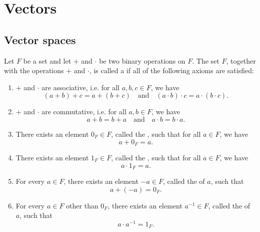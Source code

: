 \chapter{Vectors}\label{chap:vectors}

\section{Vector spaces}

\begin{defn}
Let $ F $ be a set and let $ + $ and $ \cdot $ be two binary operations on $ F $. The set $ F $, together with the operations $ + $ and $ \cdot $, is called a  if all of the following axioms are satisfied:
\begin{enumerate}
    \item $ + $ and $ \cdot $ are associative, i.e. for all $ a,b,c\in F $, we have
    \begin{equation*}
        (a+b)+c=a+(b+c) \quad\text{and}\quad (a\cdot b)\cdot c=a\cdot(b\cdot c).
    \end{equation*}

    \item $ + $ and $ \cdot $ are commutative, i.e. for all $ a,b\in F $, we have
    \begin{equation*}
        a+b=b+a \quad\text{and}\quad a\cdot b=b\cdot a.
    \end{equation*}

    \item There exists an element $ 0_F\in F $, called the , such that for all $ a\in F $, we have
    \begin{equation*}
        a+0_F=a.
    \end{equation*}

    \item There exists an element $ 1_F\in F $, called the , such that for all $ a\in F $, we have
    \begin{equation*}
        a\cdot 1_F=a.
    \end{equation*}

    \item For every $ a\in F $, there exists an element $ -a\in F $, called the  of $ a $, such that
    \begin{equation*}
        a+(-a)=0_F.
    \end{equation*}

    \item For every $ a\in F $ other than $ 0_F $, there exists an element $ a^{-1}\in F $, called the  of $ a $, such that
    \begin{equation*}
        a\cdot a^{-1}=1_F.
    \end{equation*}


\end{enumerate}
\end{defn}
